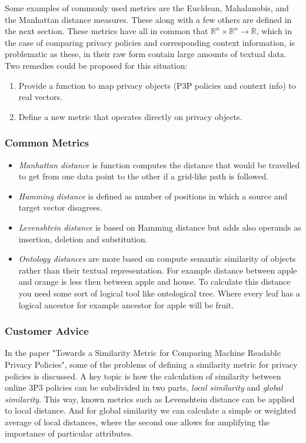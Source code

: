 Some examples of commonly used metrics are the Eucldean, Mahalanobis, and the Manhattan distance measures. These along with a few others are defined in the next section. These metrics have all in common that $\mathbb{R}^n\times \mathbb{R}^n\longrightarrow \mathbb{R}$, which in the case of comparing privacy policies and corresponding context information, is problematic as these, in their raw form contain large amounts of textual data. Two remedies could be proposed for this situation:

\begin{enumerate}
\item Provide a function to map privacy objects (P3P policies and context info) to real vectors.
\item Define a new metric that operates directly on privacy objects.
\end{enumerate}


\subsubsection{Common Metrics}

\begin{itemize}
\item \emph{Manhattan distance} is function computes the distance that would be travelled to get from one data point to the other if a grid-like path is followed. 
\item \emph{Hamming distance} is defined as number of positions in which a source and target vector disagrees.
\item \emph{Levenshtein distance} is based on Hamming distance but adds also operands as insertion, deletion and substitution. 
\item \emph{Ontology distances} are more based on compute semantic similarity of objects rather than their textual representation. For example distance between apple and orange is less then between apple and house. To calculate this distance you need some sort of logical tool like ontological tree. Where every leaf has a logical ancestor for example ancestor for apple will be fruit.
\end{itemize}
\subsubsection{Customer Advice}

In the paper "Towards a Similarity Metric for Comparing Machine Readable Privacy Policies", some of the problems of defining a similarity metric for privacy policies is discussed. A key topic is how the calculation of similarity between online 3P3 policies can be subdivided in two parts, \emph{local similarity} and \emph{global similarity}. This way, known metrics such as Levenshtein distance  can be applied to local distance. And for global similarity we can calculate a simple or weighted average of local distances, where the second one allows for amplifying the importance of particular attributes.


